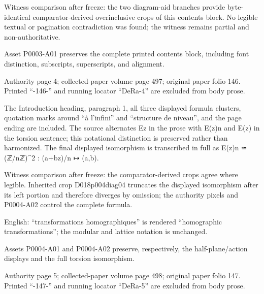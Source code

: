 \documentclass[11pt,a4paper]{article}
\begin{document}
Witness comparison after freeze: the two diagram-aid branches provide byte-identical comparator-derived overinclusive crops of this contents block. No legible textual or pagination contradiction was found; the witness remains partial and non-authoritative.

Asset P0003-A01 preserves the complete printed contents block, including font distinction, subscripts, superscripts, and alignment.


\par\medskip
\hypertarget{D018-P0004}{}
\par\smallskip
Authority page 4; collected-paper volume page 497; original paper folio 146. Printed “-146-” and running locator “DeRa-4” are excluded from body prose.

The Introduction heading, paragraph 1, all three displayed formula clusters, quotation marks around “à l'infini” and “structure de niveau”, and the page ending are included. The source alternates E\textunderscore{}z in the prose with E(z)\textunderscore{}n and E(z) in the torsion sentence; this notational distinction is preserved rather than harmonized. The final displayed isomorphism is transcribed in full as E(z)\textunderscore{}n ≃ (ℤ/nℤ)\textasciicircum{}2 : (a+bz)/n ↦ (a,b).

Witness comparison after freeze: the comparator-derived crops agree where legible. Inherited crop D018\textunderscore{}p004\textunderscore{}diag04 truncates the displayed isomorphism after its left portion and therefore diverges by omission; the authority pixels and P0004-A02 control the complete formula.

English: “transformations homographiques” is rendered “homographic transformations”; the modular and lattice notation is unchanged.

Assets P0004-A01 and P0004-A02 preserve, respectively, the half-plane/action displays and the full torsion isomorphism.


\par\medskip
\hypertarget{D018-P0005}{}
\par\smallskip
Authority page 5; collected-paper volume page 498; original paper folio 147. Printed “-147-” and running locator “DeRa-5” are excluded from body prose.
\end{document}
